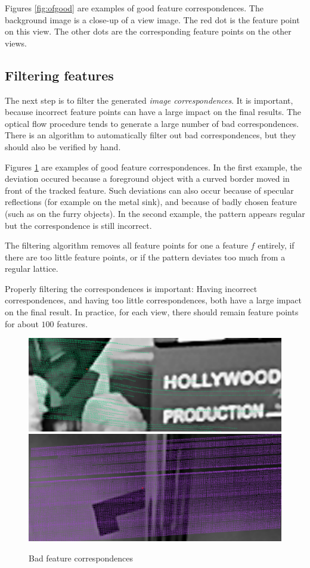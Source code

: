 \documentclass{scrreprt}
\begin{document}
Figures \ref{fig:ofgood} are examples of good feature correspondences. The background image is a close-up of a view image. The red dot is the feature point on this view. The other dots are the corresponding feature points on the other views. 

\subsection{Filtering features}
The next step is to filter the generated \emph{image correspondences}. It is important, because incorrect feature points can have a large impact on the final results. The optical flow procedure tends to generate a large number of bad correspondences. There is an algorithm to automatically filter out bad correspondences, but they should also be verified by hand.

Figures \ref{fig:ofbad} are examples of good feature correspondences. In the first example, the deviation occured because a foreground object with a curved border moved in front of the tracked feature. Such deviations can also occur because of specular reflections (for example on the metal sink), and because of badly chosen feature (such as on the furry objects). In the second example, the pattern appears regular but the correspondence is still incorrect.

The filtering algorithm removes all feature points for one a feature $f$ entirely, if there are too little feature points, or if the pattern deviates too much from a regular lattice.

Properly filtering the correspondences is important: Having incorrect correspondences, and having too little correspondences, both have a large impact on the final result. In practice, for each view, there should remain feature points for about $100$ features.

\begin{figure}
\includegraphics[width=\textwidth]{ofbad2.png}
\includegraphics[width=\textwidth]{ofbad1.png}
\caption{Bad feature correspondences}
\label{fig:ofbad}
\end{figure}
\end{document}
